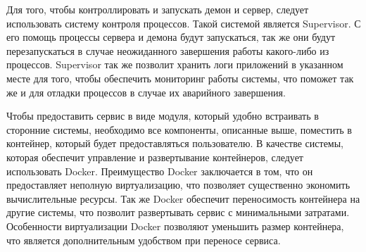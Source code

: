 Для того, чтобы контроллировать и запускать демон и сервер, следует использовать систему контроля процессов. Такой системой является Supervisor. С его помощь процессы сервера и демона будут запускаться, так же они будут перезапускаться в случае неожиданного завершения работы какого-либо из процессов. Supervisor так же позволит хранить логи приложений в указанном месте для того, чтобы обеспечить мониторинг работы системы, что поможет так же и для отладки процессов в случае их аварийного завершения.

Чтобы предоставить сервис в виде модуля, который удобно встраивать в сторонние системы, необходимо все компоненты, описанные выше, поместить в контейнер, который будет предоставляться пользователю. В качестве системы, которая обеспечит управление и развертывание контейнеров, следует использовать Docker. Преимущество Docker заключается в том, что он предоставляет неполную виртуализацию, что позволяет существенно экономить вычислительные ресурсы. Так же Docker обеспечит переносимость контейнера на другие системы, что позволит развертывать сервис с минимальными затратами. Особенности виртуализации Docker позволяют уменьшить размер контейнера, что является дополнительным удобством при переносе сервиса.
